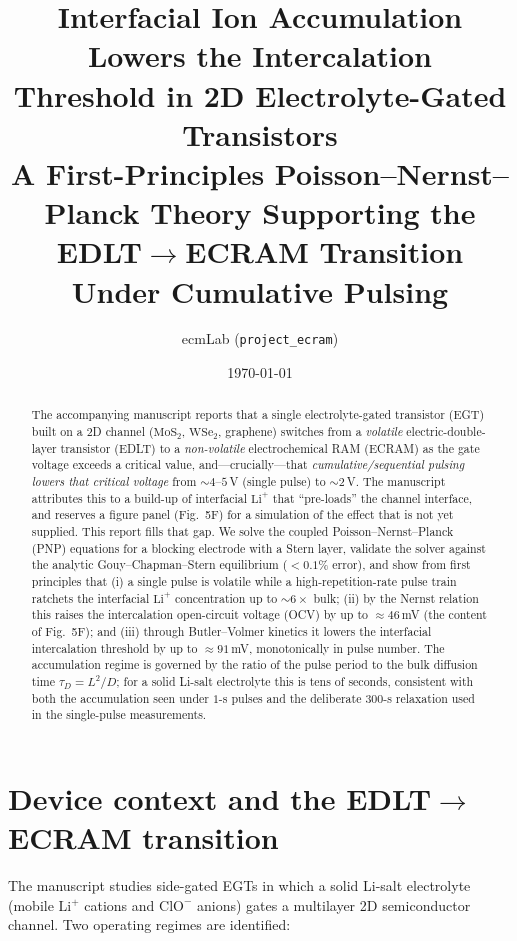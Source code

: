 \documentclass[11pt,a4paper]{article}
\title{\textbf{Interfacial Ion Accumulation Lowers the Intercalation\\
Threshold in 2D Electrolyte-Gated Transistors}\\[4pt]
\large A First-Principles Poisson--Nernst--Planck Theory Supporting the\\
EDLT$\rightarrow$ECRAM Transition Under Cumulative Pulsing}
\author{ecmLab \quad (\texttt{project\_ecram})}
\date{\today}
\newcommand{\Lip}{\ensuremath{\mathrm{Li^{+}}}}
\begin{document}
\maketitle

\begin{abstract}
\noindent
The accompanying manuscript reports that a single electrolyte-gated transistor
(EGT) built on a 2D channel ($\mathrm{MoS_2}$, $\mathrm{WSe_2}$, graphene)
switches from a \emph{volatile} electric-double-layer transistor (EDLT) to a
\emph{non-volatile} electrochemical RAM (ECRAM) as the gate voltage exceeds a
critical value, and---crucially---that \emph{cumulative/sequential pulsing
lowers that critical voltage} from ${\sim}4$--$5$\,V (single pulse) to
${\sim}2$\,V. The manuscript attributes this to a build-up of interfacial \Lip{}
that ``pre-loads'' the channel interface, and reserves a figure panel
(Fig.~5F) for a simulation of the effect that is not yet supplied. This report
fills that gap. We solve the coupled Poisson--Nernst--Planck (PNP) equations for
a blocking electrode with a Stern layer, validate the solver against the
analytic Gouy--Chapman--Stern equilibrium ($<0.1\%$ error), and show from first
principles that (i) a single pulse is volatile while a high-repetition-rate
pulse train ratchets the interfacial \Lip{} concentration up to ${\sim}6\times$
bulk; (ii) by the Nernst relation this raises the intercalation open-circuit
voltage (OCV) by up to ${\approx}46$\,mV (the content of Fig.~5F); and (iii)
through Butler--Volmer kinetics it lowers the interfacial intercalation
threshold by up to ${\approx}91$\,mV, monotonically in pulse number. The
accumulation regime is governed by the ratio of the pulse period to the bulk
diffusion time $\tau_D=L^2/D$; for a solid Li-salt electrolyte this is tens of
seconds, consistent with both the accumulation seen under $1$-s pulses and the
deliberate $300$-s relaxation used in the single-pulse measurements.
\end{abstract}

\tableofcontents
\newpage

\section{Device context and the EDLT$\rightarrow$ECRAM transition}
The manuscript studies side-gated EGTs in which a solid Li-salt electrolyte
(mobile \Lip{} cations and $\mathrm{ClO^{-}}$ anions) gates a multilayer 2D
semiconductor channel. Two operating regimes are identified:
\end{document}
